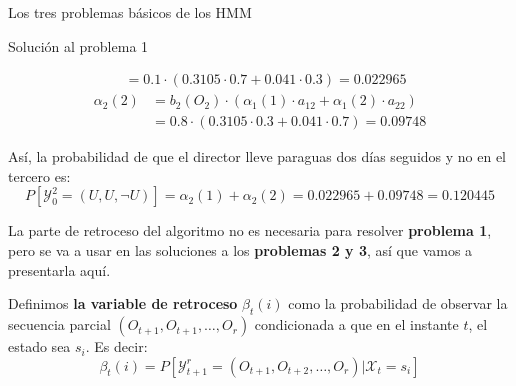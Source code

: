 \begin{section}{Los tres problemas básicos de los HMM}
\begin{subsection}{Solución al problema 1}
\begin{exampleth}
\begin{itemize}
\[\begin{aligned}
        &=0.1\cdot\left( 0.3105\cdot0.7+0.041\cdot0.3 \right) = 0.022965
    \end{aligned}
    \]
    \[
    \begin{aligned}
        \alpha_2(2)&=b_2(O_2)\cdot\left(\alpha_1(1)\cdot a_{12}+\alpha_1(2)\cdot a_{22} \right)\\
        &=0.8\cdot\left(0.3105\cdot0.3+0.041\cdot0.7\right)=0.09748
    \end{aligned}
    \]
\end{itemize}
Así, la probabilidad de que el director lleve paraguas dos días seguidos y no en el tercero es:
\[P[\mathcal{Y}_0^2=(U,U,\neg U)]=\alpha_2(1)+\alpha_2(2)=0.022965+0.09748=0.120445\]
\end{exampleth}

La parte de retroceso del algoritmo no es necesaria para resolver \textbf{problema 1}, pero se va a usar en las soluciones a los \textbf{problemas 2 y 3}, así que vamos a presentarla aquí. 

\begin{definition}
Definimos \textbf{la variable de retroceso} $\beta_t(i)$ como la probabilidad de observar la secuencia parcial $(O_{t+1},O_{t+1},\dots,O_{r})$ condicionada a que en el instante $t$, el estado sea $s_i$. Es decir:
\[\beta_t(i)=P[\mathcal{Y}_{t+1}^r=(O_{t+1},O_{t+2},\dots,O_{r})|\mathcal{X}_t=s_i]\]
\end{definition}


\end{subsection}
\end{section}
